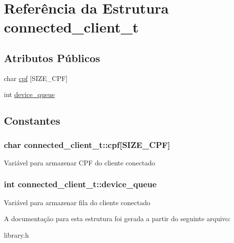 \hypertarget{structconnected__client__t}{
\section{Referência da Estrutura connected\_\-client\_\-t}
\label{structconnected__client__t}
}
\subsection*{Atributos Públicos}
\begin{DoxyCompactItemize}
\item 
char \hyperlink{structconnected__client__t_ab7d7dd95fada21339e2920e85425a4fd}{cpf} \mbox{[}SIZE\_\-CPF\mbox{]}
\item 
int \hyperlink{structconnected__client__t_a406eef935e1b3ad97622869853ff886c}{device\_\-queue}
\end{DoxyCompactItemize}


\subsection{Constantes}
\hypertarget{structconnected__client__t_ab7d7dd95fada21339e2920e85425a4fd}{
\subsubsection[{cpf}]{\setlength{\rightskip}{0pt plus 5cm}char {\bf connected\_\-client\_\-t::cpf}\mbox{[}SIZE\_\-CPF\mbox{]}}}
\label{structconnected__client__t_ab7d7dd95fada21339e2920e85425a4fd}
Variável para armazenar CPF do cliente conectado \hypertarget{structconnected__client__t_a406eef935e1b3ad97622869853ff886c}{
\subsubsection[{device\_\-queue}]{\setlength{\rightskip}{0pt plus 5cm}int {\bf connected\_\-client\_\-t::device\_\-queue}}}
\label{structconnected__client__t_a406eef935e1b3ad97622869853ff886c}
Variável para armazenar fila do cliente conectado 

A documentação para esta estrutura foi gerada a partir do seguinte arquivo:\begin{DoxyCompactItemize}
\item 
library.h\end{DoxyCompactItemize}
